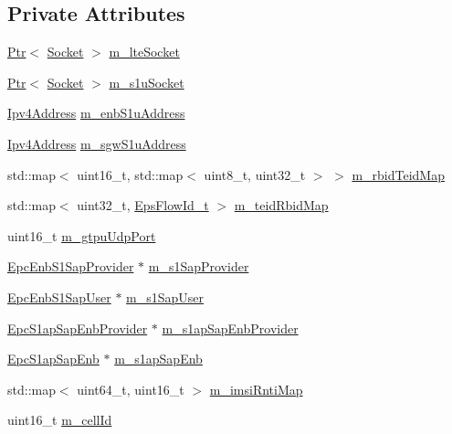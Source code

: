 \subsection*{Private Attributes}
\begin{DoxyCompactItemize}
\item 
\hyperlink{classns3_1_1Ptr}{Ptr}$<$ \hyperlink{classns3_1_1Socket}{Socket} $>$ \hyperlink{classns3_1_1EpcEnbApplication_a510a8ee52d8499fa9e1f54b26486a80f}{m\+\_\+lte\+Socket}
\item 
\hyperlink{classns3_1_1Ptr}{Ptr}$<$ \hyperlink{classns3_1_1Socket}{Socket} $>$ \hyperlink{classns3_1_1EpcEnbApplication_a1132d36c557a8a6134d014f6d187cb43}{m\+\_\+s1u\+Socket}
\item 
\hyperlink{classns3_1_1Ipv4Address}{Ipv4\+Address} \hyperlink{classns3_1_1EpcEnbApplication_a0edb76abc19ab0ed92f5086c2fad0d1f}{m\+\_\+enb\+S1u\+Address}
\item 
\hyperlink{classns3_1_1Ipv4Address}{Ipv4\+Address} \hyperlink{classns3_1_1EpcEnbApplication_a45451c42063c8eefec6e0f16b36718f1}{m\+\_\+sgw\+S1u\+Address}
\item 
std\+::map$<$ uint16\+\_\+t, std\+::map$<$ uint8\+\_\+t, uint32\+\_\+t $>$ $>$ \hyperlink{classns3_1_1EpcEnbApplication_a06ad312a7c59dd349c44bbdecf3c7358}{m\+\_\+rbid\+Teid\+Map}
\item 
std\+::map$<$ uint32\+\_\+t, \hyperlink{structns3_1_1EpcEnbApplication_1_1EpsFlowId__t}{Eps\+Flow\+Id\+\_\+t} $>$ \hyperlink{classns3_1_1EpcEnbApplication_abc1df9a1103bb552fc8131e9cd45ab33}{m\+\_\+teid\+Rbid\+Map}
\item 
uint16\+\_\+t \hyperlink{classns3_1_1EpcEnbApplication_ab28f95f379316c6d236f119ee65123c0}{m\+\_\+gtpu\+Udp\+Port}
\item 
\hyperlink{classns3_1_1EpcEnbS1SapProvider}{Epc\+Enb\+S1\+Sap\+Provider} $\ast$ \hyperlink{classns3_1_1EpcEnbApplication_ad7e9b81b4168a86e856cbc8b4ae55dae}{m\+\_\+s1\+Sap\+Provider}
\item 
\hyperlink{classns3_1_1EpcEnbS1SapUser}{Epc\+Enb\+S1\+Sap\+User} $\ast$ \hyperlink{classns3_1_1EpcEnbApplication_aaafcd864038cc863330565126353c521}{m\+\_\+s1\+Sap\+User}
\item 
\hyperlink{classns3_1_1EpcS1apSapEnbProvider}{Epc\+S1ap\+Sap\+Enb\+Provider} $\ast$ \hyperlink{classns3_1_1EpcEnbApplication_aea4917aa066399d72225c3408772020f}{m\+\_\+s1ap\+Sap\+Enb\+Provider}
\item 
\hyperlink{classns3_1_1EpcS1apSapEnb}{Epc\+S1ap\+Sap\+Enb} $\ast$ \hyperlink{classns3_1_1EpcEnbApplication_a08723a377d93a90f768f48a7a6386e19}{m\+\_\+s1ap\+Sap\+Enb}
\item 
std\+::map$<$ uint64\+\_\+t, uint16\+\_\+t $>$ \hyperlink{classns3_1_1EpcEnbApplication_a9e51467fe97aafabac7d51f056850fea}{m\+\_\+imsi\+Rnti\+Map}
\item 
uint16\+\_\+t \hyperlink{classns3_1_1EpcEnbApplication_a77c5a697bc069ae78c8fbc5b781f43b5}{m\+\_\+cell\+Id}
\end{DoxyCompactItemize}
